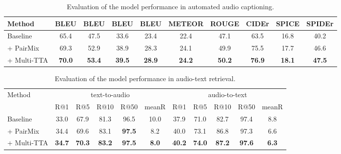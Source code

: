\documentclass{INTERSPEECH2023}
\begin{document}
\begin{table*}[t]
\caption{Evaluation of the model performance in automated audio captioning.}
\label{table:aac}
\centering{}
\begin{tabular}{l|ccccccccc}
\hline
    Method  & BLEU & BLEU & BLEU & BLEU & METEOR & ROUGE & CIDEr & SPICE & SPIDEr\\ 
   \hline
   Baseline \cite{mei2021audio} & 65.4 & 47.5 & 33.6 & 23.4 & 22.4 & 47.1 & 63.5 & 16.8 & 40.2\\   + PairMix & 69.3 & 52.9 & 38.9 & 28.3 & 24.1 & 49.9 & 75.5 & 17.7 & 46.6\\
   + Multi-TTA & \textbf{70.0} & \textbf{53.4} & \textbf{39.5} & \textbf{28.9} & \textbf{24.2} & \textbf{50.2} & \textbf{76.9} & \textbf{18.1} & \textbf{47.5}\\
   \hline

\end{tabular}
\end{table*}

\begin{table*}[t]
\caption{Evaluation of the model performance in audio-text retrieval.}
\label{table:retrieval}
\centering{}
\begin{tabular}{l|ccccc|ccccc}
\hline
    \multirow{2}{*}{Method} & \multicolumn{5}{c|}{text-to-audio} & \multicolumn{5}{c}{audio-to-text}\\ 
    \cline{2 - 11}
      & R@1 & R@5 & R@10 & R@50 & meanR & R@1 & R@5 & R@10 & R@50 & meanR \\ 
    \hline
    Baseline \cite{Mei2022-qx} & 33.0 & 67.9 & 81.3 & 96.5 & 10.0 & 37.9 & 71.0 & 82.7 & 97.4 & 8.8 \\
    + PairMix & 34.4 & 69.6 & 83.1 & \textbf{97.5} & 8.2 & 40.0 & 73.1 & 86.8 & 97.3 & 6.6 \\
    + Multi-TTA & \textbf{34.7} & \textbf{70.3} & \textbf{83.2} & \textbf{97.5} & \textbf{8.0} & \textbf{40.2} & \textbf{74.0} & \textbf{87.2} & \textbf{97.6} & \textbf{6.3} \\
    \hline
\end{tabular}
\end{table*}
\end{document}
